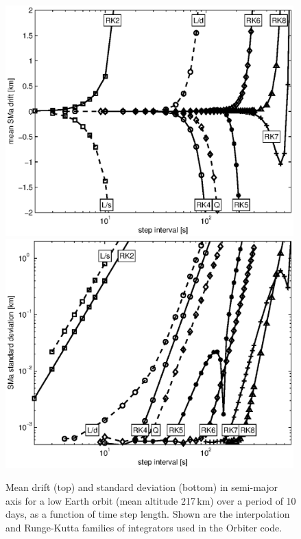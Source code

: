 \documentclass[a4paper]{article}
\begin{document}
\begin{figure}\centering
\includegraphics[width=0.99\textwidth]{sma_dev}\\
\includegraphics[width=0.99\textwidth]{sma_std}
\caption{Mean drift (top) and standard deviation (bottom) in semi-major axis for a low Earth orbit (mean altitude 217\,km) over a period of 10 days, as a function of time step length. Shown are the interpolation and Runge-Kutta families of integrators used in the Orbiter code.}
\label{fig:1day_err}
\end{figure}
\end{document}
